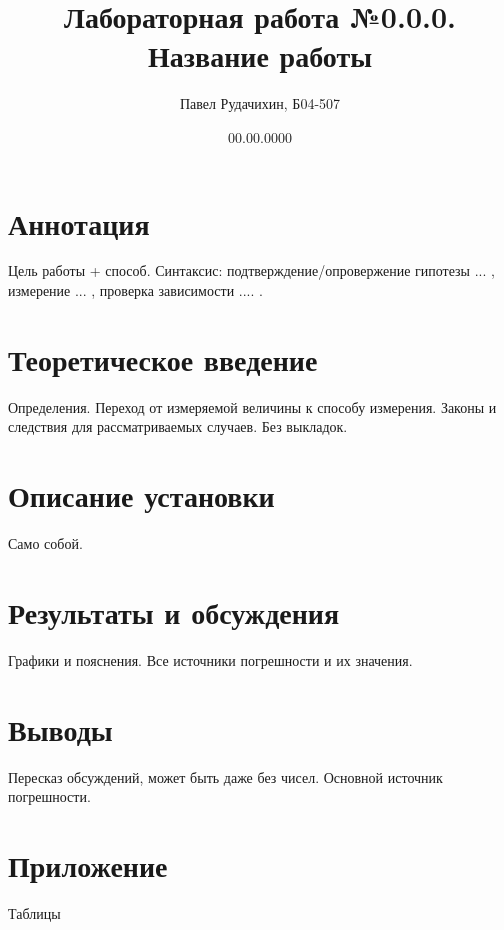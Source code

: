 \documentclass{article}
\title{Лабораторная работа №0.0.0. \\ \textbf{Название работы}}
\author{Павел Рудачихин, Б04-507}
\date{00.00.0000}
\begin{document}
\maketitle{}


\section {Аннотация} 
	
	Цель работы + способ. Синтаксис: подтверждение/опровержение гипотезы ... , измерение ... , проверка зависимости .... . 
	

\section {Теоретическое введение}

	Определения. Переход от измеряемой величины к способу измерения. Законы и следствия для рассматриваемых случаев. Без выкладок.
	
	
\section{Описание установки}

	Само собой.
	
	
	
\section{Результаты и обсуждения}

	Графики и пояснения. Все источники погрешности и их значения.
	

\section{Выводы}

	Пересказ обсуждений, может быть даже без чисел. Основной источник погрешности.   


\section{Приложение}

	Таблицы
\end{document}
